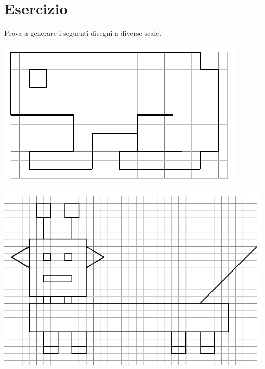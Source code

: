 \section{Esercizio}
Prova a generare i seguenti disegni a diverse scale.\\
\begin{center}
	\includegraphics[scale=0.6]{pics/variables-grenouille.png}
\end{center}
\begin{center}
	\includegraphics[scale=0.75]{pics/variables-robot.png}
\end{center}
